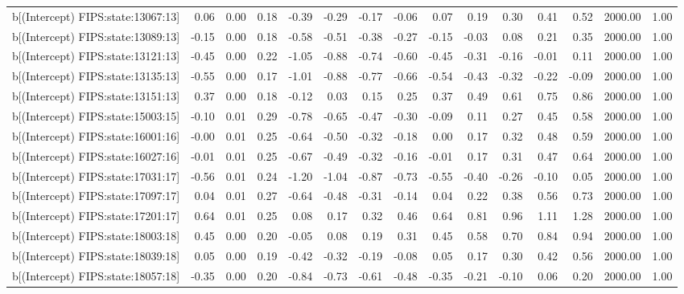 \begin{table}[ht]
\begin{tabular}{rrrrrrrrrrrrrrr}
  b[(Intercept) FIPS:state:13067:13] & 0.06 & 0.00 & 0.18 & -0.39 & -0.29 & -0.17 & -0.06 & 0.07 & 0.19 & 0.30 & 0.41 & 0.52 & 2000.00 & 1.00 \\ 
  b[(Intercept) FIPS:state:13089:13] & -0.15 & 0.00 & 0.18 & -0.58 & -0.51 & -0.38 & -0.27 & -0.15 & -0.03 & 0.08 & 0.21 & 0.35 & 2000.00 & 1.00 \\ 
  b[(Intercept) FIPS:state:13121:13] & -0.45 & 0.00 & 0.22 & -1.05 & -0.88 & -0.74 & -0.60 & -0.45 & -0.31 & -0.16 & -0.01 & 0.11 & 2000.00 & 1.00 \\ 
  b[(Intercept) FIPS:state:13135:13] & -0.55 & 0.00 & 0.17 & -1.01 & -0.88 & -0.77 & -0.66 & -0.54 & -0.43 & -0.32 & -0.22 & -0.09 & 2000.00 & 1.00 \\ 
  b[(Intercept) FIPS:state:13151:13] & 0.37 & 0.00 & 0.18 & -0.12 & 0.03 & 0.15 & 0.25 & 0.37 & 0.49 & 0.61 & 0.75 & 0.86 & 2000.00 & 1.00 \\ 
  b[(Intercept) FIPS:state:15003:15] & -0.10 & 0.01 & 0.29 & -0.78 & -0.65 & -0.47 & -0.30 & -0.09 & 0.11 & 0.27 & 0.45 & 0.58 & 2000.00 & 1.00 \\ 
  b[(Intercept) FIPS:state:16001:16] & -0.00 & 0.01 & 0.25 & -0.64 & -0.50 & -0.32 & -0.18 & 0.00 & 0.17 & 0.32 & 0.48 & 0.59 & 2000.00 & 1.00 \\ 
  b[(Intercept) FIPS:state:16027:16] & -0.01 & 0.01 & 0.25 & -0.67 & -0.49 & -0.32 & -0.16 & -0.01 & 0.17 & 0.31 & 0.47 & 0.64 & 2000.00 & 1.00 \\ 
  b[(Intercept) FIPS:state:17031:17] & -0.56 & 0.01 & 0.24 & -1.20 & -1.04 & -0.87 & -0.73 & -0.55 & -0.40 & -0.26 & -0.10 & 0.05 & 2000.00 & 1.00 \\ 
  b[(Intercept) FIPS:state:17097:17] & 0.04 & 0.01 & 0.27 & -0.64 & -0.48 & -0.31 & -0.14 & 0.04 & 0.22 & 0.38 & 0.56 & 0.73 & 2000.00 & 1.00 \\ 
  b[(Intercept) FIPS:state:17201:17] & 0.64 & 0.01 & 0.25 & 0.08 & 0.17 & 0.32 & 0.46 & 0.64 & 0.81 & 0.96 & 1.11 & 1.28 & 2000.00 & 1.00 \\ 
  b[(Intercept) FIPS:state:18003:18] & 0.45 & 0.00 & 0.20 & -0.05 & 0.08 & 0.19 & 0.31 & 0.45 & 0.58 & 0.70 & 0.84 & 0.94 & 2000.00 & 1.00 \\ 
  b[(Intercept) FIPS:state:18039:18] & 0.05 & 0.00 & 0.19 & -0.42 & -0.32 & -0.19 & -0.08 & 0.05 & 0.17 & 0.30 & 0.42 & 0.56 & 2000.00 & 1.00 \\ 
  b[(Intercept) FIPS:state:18057:18] & -0.35 & 0.00 & 0.20 & -0.84 & -0.73 & -0.61 & -0.48 & -0.35 & -0.21 & -0.10 & 0.06 & 0.20 & 2000.00 & 1.00 \\ 

\end{tabular}
\end{table}
